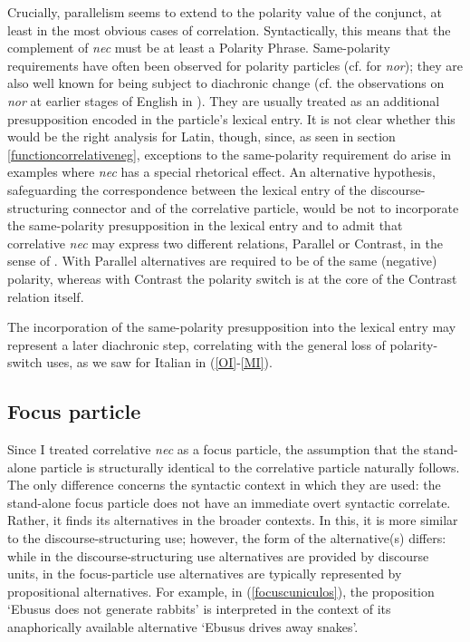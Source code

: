 \documentclass[output=paper,modfonts,nonflat,citecolor=brown,
showindex
]{langsci/langscibook}
\begin{document}
\noindent Crucially, parallelism seems to extend to the polarity value of the conjunct, at least in the most obvious cases of correlation. Syntactically, this means that the complement of {\emph{nec}} must be at least a Polarity Phrase. Same-polarity requirements have often been observed for polarity particles (cf. \citealt[519-520]{Wurmbrand08} for {\emph{nor}}); they are also well known for being subject to diachronic change (cf. the observations on {\emph{nor}} at earlier stages of English in \citealt[114]{Jespersen17}). They are usually treated as an additional presupposition encoded in the particle's lexical entry. It is not clear whether this would be the right analysis for Latin, though, since, as seen in section \ref{functioncorrelativeneg}, exceptions to the same-polarity requirement do arise in examples where {\emph{nec}} has a special rhetorical effect. An alternative hypothesis, safeguarding the correspondence between the lexical entry of the discourse-structuring connector and of the correlative particle, would be not to incorporate the same-polarity presupposition in the lexical entry and to admit that correlative {\emph{nec}} may express two different relations, Parallel or Contrast, in the sense of \citet{Asher93}. With Parallel alternatives are required to be of the same (negative) polarity, whereas with Contrast the polarity switch is at the core of the Contrast relation itself. 

The incorporation of the same-polarity presupposition into the lexical entry may represent a later diachronic step, correlating with the general loss of polarity-switch uses, as we saw for Italian in (\ref{OI}-\ref{MI}).

\subsection{Focus particle}

Since I treated correlative {\emph{nec}} as a focus particle, the assumption that the stand-alone particle is structurally identical to the correlative particle naturally follows. The only difference concerns the syntactic context in which they are used: the stand-alone focus particle does not have an immediate overt syntactic correlate. Rather, it finds its alternatives in the broader contexts. In this, it is more similar to the discourse-structuring use; however, the form of the alternative(s) differs: while in the discourse-structuring use alternatives are provided by discourse units, in the focus-particle use alternatives are typically represented by propositional alternatives. For example, in (\ref{focuscuniculos}), the proposition `Ebusus does not generate rabbits' is interpreted in the context of its anaphorically available alternative `Ebusus drives away snakes'. 
\end{document}
